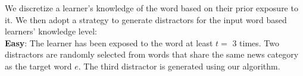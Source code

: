 %
%
%


We discretize a learner's knowledge of the word based on their prior
exposure to it.  We then adopt a strategy to generate distractors for
the input word based learners' knowledge level: \\

{\bf Easy}: The learner has been exposed to the word at least $t=$ 3
times.  Two distractors are randomly selected from words that share
the same news category as the target word $e$. The third distractor is
generated using our algorithm. \\

